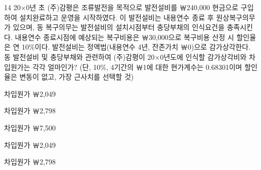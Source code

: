 \begin{question}{14}
20×0년 초 (주)감평은 조류발전을 목적으로 발전설비를 ￦240,000 현금으로 구입하여 설치완료하고 운영을 시작하였다. 이 발전설비는 내용연수 종료 후 원상복구의무가 있으며, 동 복구의무는 발전설비의 설치시점부터 충당부채의 인식요건을 충족시킨다. 내용연수 종료시점에 예상되는 복구비용은 ￦30,000으로 복구비용 산정 시 할인율은 연 10\%이다. 발전설비는 정액법(내용연수 4년, 잔존가치 ￦0)으로 감가상각한다. 동 발전설비 및 충당부채와 관련하여 (주)감평이 20×0년도에 인식할 감가상각비와 차입원가는 각각 얼마인가? (단, 10\%, 4기간의 ￦1에 대한 현가계수는 0.68301이며 할인율은 변동이 없고, 가장 근사치를 선택할 것)
\begin{choices}
  \item {}차입원가 ￦2,049
  \item {}차입원가 ￦2,798
  \item {}차입원가 ￦7,500
  \item {}차입원가 ￦2,049
  \item {}차입원가 ￦2,798
\end{choices}
\end{question}
